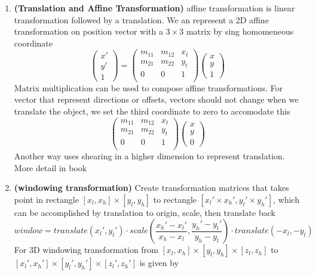 \documentclass[11pt]{article}
\newcommand{\bheading}[1]{\textbf{(#1)}}
\begin{document}
\begin{enumerate}
    \item \bheading{Translation and Affine Transformation} affine transformation is linear transformation followed by a translation. We an represent a 2D affine transformation on position vector with a $3\times 3$ matrix by sing homomeneous coordinate
    \[
        \begin{pmatrix}
            x' \\ y' \\ 1 
        \end{pmatrix}   
        =
        \begin{pmatrix}
            m_{11} & m_{12} & x_t \\
            m_{21} & m_{22} & y_t \\
            0 & 0 & 1 \\
        \end{pmatrix}  
        \begin{pmatrix}
            x \\ y \\ 1
        \end{pmatrix}
    \]
    Matrix multiplication can be used to compose affine transformations. For vector that represent directions or offsets, vectors should not change when we translate the object, we set the third coordinate to zero to accomodate this
    \[
        \begin{pmatrix}
            m_{11} & m_{12} & x_t \\
            m_{21} & m_{22} & y_t \\
            0 & 0 & 1 \\
        \end{pmatrix}  
        \begin{pmatrix}
            x \\ y \\ 0
        \end{pmatrix}    
    \]
    Another way uses shearing in a higher dimension to represent translation. More detail in book
    \item \bheading{windowing transformation} Create transformation matrices that takes point in rectangle $[x_l,x_h] \times [y_l, y_h]$ to rectangle $[x_l'\times x_h', y_l' \times y_h']$, which can be accomplished by translation to origin, scale, then translate back
    \[
        window = 
        translate(x_l', y_l') \cdot
        scale(\frac{x_h' - x_l'}{x_h - x_l}, \frac{y_h' - y_l'}{y_h - y_l}) \cdot
        translate(-x_l, -y_l)
    \]
    For 3D windowing transformation from $[x_l,x_h] \times [y_l, y_h] \times [z_l, z_h]$ to $[x_l',x_h'] \times [y_l', y_h'] \times [z_l', z_h']$ is given by

\end{enumerate}
\end{document}
